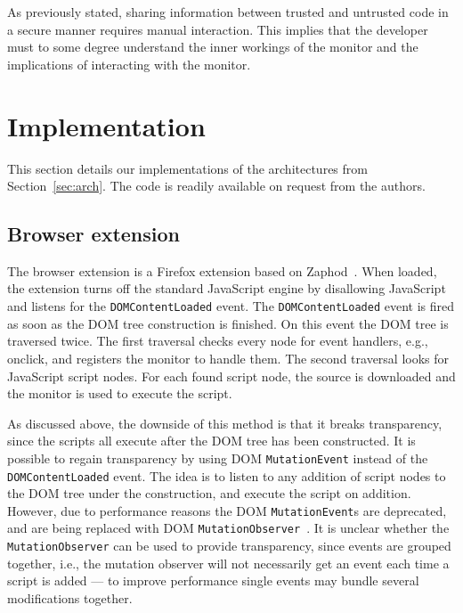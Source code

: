 \documentclass{llncs}
\begin{document}
As previously stated, sharing information 
between trusted and untrusted code in a secure manner requires manual interaction. 
This implies that the developer must to some degree understand the inner workings of the monitor
and the implications of interacting with the monitor.


\vspace{-.4cm}
\section{Implementation}
\label{sec:impl}
\vspace{-.2cm}

This section details our implementations of the architectures
from Section~\ref{sec:arch}. The code is readily available on request
from the authors.


\vspace{-.4cm}
\subsection{Browser extension}
\vspace{-.2cm}


The browser extension is a Firefox extension based on Zaphod~\cite{Zaphod}.
%
When loaded, the extension turns off the standard JavaScript engine by
disallowing JavaScript and listens for the \lstinline{DOMContentLoaded} event.  The
\lstinline{DOMContentLoaded} event is fired as soon as the DOM tree construction is
finished.  On this event the DOM tree is traversed twice. The first traversal
checks every node for event handlers, e.g., onclick, and registers the monitor
to handle them. The second traversal looks for JavaScript script nodes.  For
each found script node, the source is downloaded and the
monitor is used to execute the script.

As discussed above, the downside of this method is that it breaks
transparency, since the scripts all execute after the DOM
tree has been constructed. It is possible to regain transparency by using DOM
\lstinline{MutationEvent} instead of the \lstinline{DOMContentLoaded} event.  The idea is to listen
to any addition of script nodes to the DOM tree under the construction, and
execute the script on addition.  However, due to performance reasons the DOM
\lstinline{MutationEvent}s are deprecated, and are being replaced with DOM \lstinline{MutationObserver}~\cite{DOM4}. 
It is unclear whether the \lstinline{MutationObserver} can be used to
provide transparency, since events are grouped together, i.e., the mutation
observer will not necessarily get an event each time a script is added ---
to improve performance single
events may bundle several modifications together.
\end{document}
